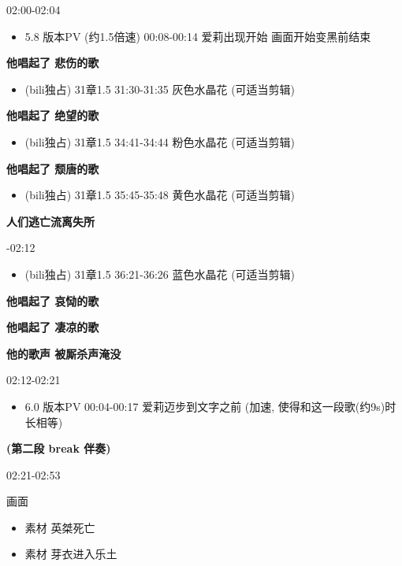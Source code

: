 \documentclass[a4paper]{article}
\begin{document}
02:00-02:04

\begin{itemize}
    \item 5.8 版本PV (约1.5倍速) 00:08-00:14 爱莉出现开始 画面开始变黑前结束
\end{itemize}

\textbf{他唱起了 悲伤的歌}

\begin{itemize}
    \item (bili独占) 31章1.5 31:30-31:35 灰色水晶花 (可适当剪辑)
\end{itemize}

\textbf{他唱起了 绝望的歌}

\begin{itemize}
    \item (bili独占) 31章1.5 34:41-34:44 粉色水晶花 (可适当剪辑)
\end{itemize}

\textbf{他唱起了 颓唐的歌}

\begin{itemize}
    \item (bili独占) 31章1.5 35:45-35:48 黄色水晶花 (可适当剪辑)
\end{itemize}

\textbf{人们逃亡流离失所}

-02:12

\begin{itemize}
    \item (bili独占) 31章1.5 36:21-36:26 蓝色水晶花 (可适当剪辑)
\end{itemize}

\textbf{他唱起了 哀恸的歌}

\textbf{他唱起了 凄凉的歌}

\textbf{他的歌声 被厮杀声淹没}

02:12-02:21

\begin{itemize}
    \item 6.0 版本PV 00:04-00:17 爱莉迈步到文字之前 (加速, 使得和这一段歌(约9s)时长相等)
\end{itemize}

\textbf{(第二段 break 伴奏)}

02:21-02:53

画面

\begin{itemize}
    \item 素材 英桀死亡
    \item 素材 芽衣进入乐土
\end{itemize}
\end{document}
